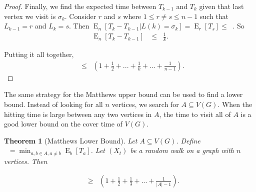 \documentclass[12pt]{article}
\newtheorem{theorem}{Theorem}
\theoremstyle{definition}
\DeclareMathOperator{\E}{\mathrm{E}}		     %
\DeclareMathOperator{\tcov}{t_\textrm{cov}}      %
\DeclareMathOperator{\hit}{t_{\textrm{hit}}}     %
\DeclareMathOperator{\tmina}{t_\textrm{min}^A}   %
\begin{document}
\begin{proof}
Finally, we find the expected time between $T_{k-1}$ and $T_{k}$
given that last vertex we visit is $\sigma_k$.
Consider $r$ and $s$ where $1 \leq r \neq s \leq n-1$
such that $L_{k-1} = r$ and $L_k = s$.
Then $\E_n[T_k - T_{k-1} | L(k) = \sigma_k] = \E_r[T_s] \leq \hit$.
So
\begin{align}
\E_n[T_k - T_{k-1}] &\leq
\hit \frac{1}{k}. \nonumber 
\end{align}

Putting it all together,
\begin{align}
\tcov \leq \hit \left( 1+ \frac{1}{2} + ... + \frac{1}{k} 
+ ... + \frac{1}{n-1} \right). \nonumber
\end{align}
\end{proof}

The same strategy for the Matthews upper bound can be used
to find a lower bound.
Instead of looking for all $n$ vertices, we search
for $A \subseteq V(G)$.
When the hitting time is large between any two vertices in $A$,
the time to visit all of $A$ is a good lower bound on the cover time
of $V(G)$.

\begin{theorem}[Matthews Lower Bound]
Let $A \subseteq V(G)$. Define $\tmina = \min_{a,b\in A, a \neq b} \E_b[T_a]$.
Let $(X_t)$ be a random walk on a graph with $n$ vertices. Then \label{thm:matthews_low}
\end{theorem}
\begin{align}
\tcov &\geq \tmina \left(1 + \frac{1}{2} + \frac{1}{3} + ... +
\frac{1}{|A| -1} \right). \nonumber
\end{align}
\end{document}
